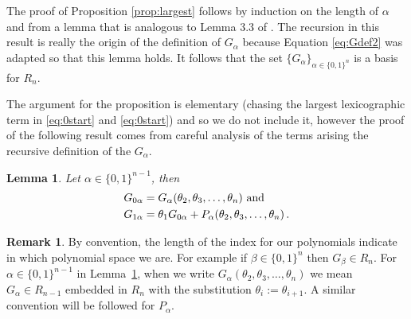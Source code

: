 \documentclass[11pt]{amsart}
\newtheorem{lemma}[theorem]{Lemma}
\theoremstyle{definition}
\newtheorem{remark}[theorem]{Remark}
\numberwithin{equation}{section}
\begin{document}
The proof of Proposition \ref{prop:largest} follows by induction
on the length of $\alpha$ and
from a lemma that is analogous to Lemma 3.3 of \cite{AB}.
The recursion in this result is really the origin of the definition
of $G_\alpha$ because Equation \eqref{eq:Gdef2}
was adapted so that this lemma holds.  It follows that
the set $\{ G_\alpha \}_{\alpha \in \{0,1\}^n}$ is a basis
for $R_n$.

The argument for the proposition is elementary (chasing the largest lexicographic
term in \eqref{eq:0start} and \eqref{eq:0start})
and so we do not include it, however the proof of the
following result comes from careful analysis of the
terms arising the recursive definition of the $G_\alpha$.

\begin{lemma}\label{lem:LT}
 Let $\alpha \in \{0,1\}^{n-1}$, then
\begin{align}
G_{0\alpha} &= G_\alpha(\theta_2, \theta_3, \ldots, \theta_n) \hbox{ and }\label{eq:0start}\\
G_{1\alpha} &= \theta_1 G_{0\alpha} + P_{\alpha}(\theta_2, \theta_3, \ldots, \theta_n)\,. \label{eq:1start}
\end{align}
\end{lemma}

\begin{remark}\label{rem:shift}
By convention, the length of the index for our polynomials indicate in which polynomial space we are.
For example if $\beta   \in \{0,1\}^{n}$ then $G_\beta\in R_n$. For $\alpha \in \{0,1\}^{n-1}$  in Lemma~\ref{lem:LT}, when we write
$G_\alpha(\theta_2, \theta_3, \ldots, \theta_n)$ we mean $G_\alpha\in  R_{n-1}$
embedded in $R_n$ with the substitution
$\theta_i:=\theta_{i+1}$. A similar convention will be followed for $P_\alpha$.
\end{remark}
\end{document}
